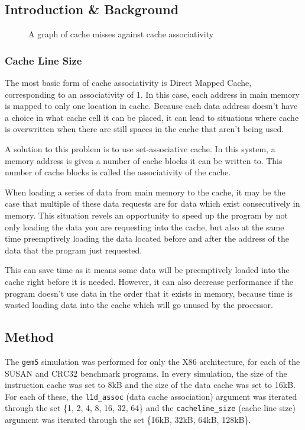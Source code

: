 
\subsection{Introduction \& Background}
\begin{wrapfigure}{R}{.5\textwidth}
    \centering
    
    \caption{A graph of cache misses against cache associativity}
    \label{fig:partb-assoc}
\end{wrapfigure}%
\subsubsection{Cache Line Size}

The most basic form of cache associativity is Direct Mapped Cache, corresponding to an
associativity of 1.
In this case, each address in main memory is mapped to only one location in cache.
Because each data address doesn't have a choice in what cache cell it can be placed,
it can lead to situations where cache is overwritten when there are still spaces in
the cache that aren't being used.

A solution to this problem is to use set-associative cache.
In this system, a memory address is given a number of cache blocks it can be written to.
This number of cache blocks is called the associativity of the cache.

When loading a series of data from main memory to the cache, it may be the case that
multiple of these data requests are for data which exist consecutively in memory.
This situation revels an opportunity to speed up the program by not only loading
the data you are requesting into the cache, but also at the same time preemptively loading
the data located before and after the address of the data that the program just requested.

This can save time as it means some data will be preemptively loaded into the cache right
before it is needed.
However, it can also decrease performance if the program doesn't use data in the order that
it exists in memory, because time is wasted loading data into the cache which will go unused
by the processor.

\subsection{Method}

The \texttt{gem5} simulation was performed for only the X86 architecture, for each of the
SUSAN and CRC32 benchmark programs.
In every simulation, the size of the instruction cache was set to 8kB and the size
of the data cache was set to 16kB.
For each of these, the \texttt{l1d\_assoc} (data cache association) argument was iterated
through the set \{1, 2, 4, 8, 16, 32, 64\} and the \texttt{cacheline\_size} (cache line size) argument
was iterated through the set \{16kB, 32kB, 64kB, 128kB\}.

